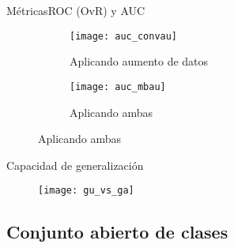 \documentclass[aspectratio = 169]{beamer}
\begin{document}
			\begin{frame}{Métricas}{ROC (OvR) y AUC}
				\begin{figure}
					\centering
					\begin{subfigure}{.4\textwidth}
						\addtocounter{subfigure}{2}
						\centering
						\texttt{[image: auc\_convau]}
						\caption{Aplicando aumento de datos}
						\label{fig:roc_convau}
					\end{subfigure}\hfill
					\begin{subfigure}{.4\textwidth}
						\centering
						\texttt{[image: auc\_mbau]}
						\caption{Aplicando ambas}
						\label{fig:roc_mbau}
					\end{subfigure}
				\end{figure}
			\end{frame}
			\begin{frame}{Capacidad de generalización}
				\begin{figure}[!h]
					\centering
					\texttt{[image: gu\_vs\_ga]}
					\label{fig:comparativa_gu}
				\end{figure}
			\end{frame}
			
		\subsection{Conjunto abierto de clases}
		
\end{document}

